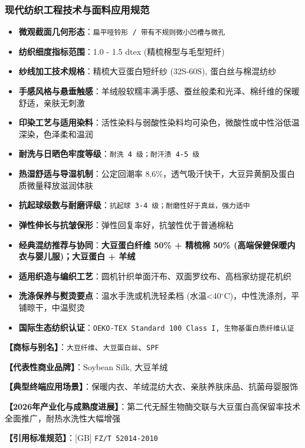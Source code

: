\documentclass[11pt,openright,twoside,UTF8]{ctexbook}
\begin{document}
\subsubsection*{现代纺织工程技术与面料应用规范}
\begin{itemize} \setlength{\itemsep}{2pt}
    \item \textbf{微观截面几何形态}：\texttt{扁平哑铃形 / 带有不规则微小凹槽与微孔}
    \item \textbf{纺织细度指标范围}：1.0 - 1.5 dtex (精梳棉型与毛型短纤)
    \item \textbf{纱线加工技术规格}：精梳大豆蛋白短纤纱 (32S-60S), 蛋白丝与棉混纺纱
    \item \textbf{手感风格与悬垂触感}：羊绒般软糯丰满手感、蚕丝般柔和光泽、棉纤维的保暖舒适，亲肤无刺激
    \item \textbf{印染工艺与适用染料}：活性染料与弱酸性染料均可染色，微酸性或中性浴低温深染，色泽柔和温润
    \item \textbf{耐洗与日晒色牢度等级}：\texttt{耐洗 4 级；耐汗渍 4-5 级}
    \item \textbf{热湿舒适与导湿机制}：公定回潮率 8.6\%，透气吸汗快干，大豆异黄酮及蛋白质微量释放滋润体肤
    \item \textbf{抗起球级数与耐磨评级}：\texttt{抗起球 3-4 级；耐磨性好于真丝，强力适中}
    \item \textbf{弹性伸长与抗皱保形}：弹性回复率好，抗皱性优于普通棉粘
    \item \textbf{经典混纺推荐与协同}：\textbf{大豆蛋白纤维 50\% + 精梳棉 50\% (高端保健保暖内衣与婴儿服)；大豆蛋白 + 羊绒}
    \item \textbf{适用织造与编织工艺}：圆机针织单面汗布、双面罗纹布、高档家纺提花机织
    \item \textbf{洗涤保养与熨烫要点}：温水手洗或机洗轻柔档 (水温\textless{}40$^\circ\mathrm{C}$)，中性洗涤剂，平铺晾干，中温熨烫
    \item \textbf{国际生态纺织认证}：\texttt{OEKO-TEX Standard 100 Class I, 生物基蛋白质纤维认证}
\end{itemize}
\vspace{0.2cm}

\noindent\textbf{【商标与别名】}：\texttt{大豆纤维}、\texttt{大豆蛋白丝}、\texttt{SPF}\par
\noindent\textbf{【代表性商业品牌】}：Soybean Silk, 大豆羊绒\par
\noindent\textbf{【典型终端应用场景】}：保暖内衣、羊绒混纺大衣、亲肤养肤床品、抗菌母婴服饰\par
\noindent\textbf{【2026年产业化与成熟度进展】}：第二代无醛生物酶交联与大豆蛋白高保留率技术全面推广，耐热水洗性大幅增强\par
\noindent\textbf{【引用标准规范】}：[GB] \texttt{FZ/T 52014-2010}\par
\vspace{0.5cm}
\end{document}
